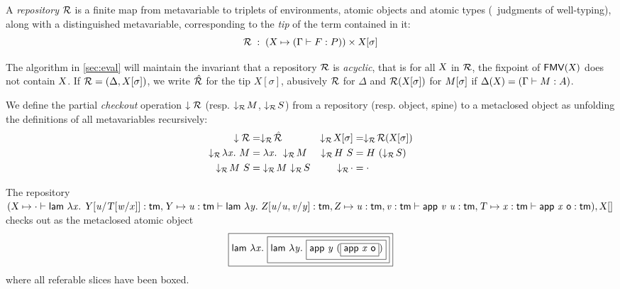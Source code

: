 \documentclass{llncs}
\begin{document}


\begin{definition}
  A \emph{repository} $\mathcal{R}$ is a finite map from metavariable to
  triplets of environments, atomic objects and atomic types (\ie\
  judgments of well-typing), along with a distinguished metavariable,
  corresponding to the \emph{tip} of the term contained in it:
$$ \mathcal{R}\;:\;(\text{\textsl{X}} \mapsto (\Gamma\vdash{F}:{P}))\times{\ensuremath{\text{\textsl{X}}}}[{\sigma}] $$
\end{definition}

The algorithm in \ref{sec:eval} will maintain the invariant that a repository $\mathcal{R}$ is
\emph{acyclic}, that is for all $\text{\textsl{X}}$ in $\mathcal{R}$, the fixpoint of
${\text{\textsf{FMV}}}({\text{\textsl{X}}})$ does not contain $\text{\textsl{X}}$. If $\mathcal{R} = (\Delta,
X[\sigma])$, we write $\hat {\mathcal{R}}$ for the tip $X[\sigma]$, abusively
$\mathcal{R}$ for $\Delta$ and $\mathcal{R} ({\text{\textsl{X}}}[{\sigma}])$ for ${M}[{\sigma}]$
if $\Delta(\text{\textsl{X}}) = (\Gamma\vdash M : A)$.

\begin{definition}
  We define the partial \emph{checkout} operation $\downarrow{\mathcal{R}}$
  (resp. $\downarrow_{\mathcal{R}}\!{M}$, $\downarrow_{\mathcal{R}}\!{S}$) from a repository
  (resp. object, spine) to a metaclosed object as unfolding the
  definitions of all metavariables recursively:
  \begin{align*}
    \checkout{\mr} &= \checkoutr{\hat{\mr}} &
    \checkoutr{\smeta X \sigma} &= \checkoutr{\mr(\smeta X\sigma)}\\
    \checkoutr{\lam x M} &= \lam x \checkoutr{M} &
    \checkoutr{\app H S} &= \app H {(\checkoutr{S})} \\
    \checkoutr{\spinecons M S} &= \spinecons {\checkoutr M} {\checkoutr S} &
    \checkoutr{\spinenil} &= \spinenil
  \end{align*}
\end{definition}

\begin{example}
  The repository
$
(
\text{\textsl{X}} \mapsto
\cdot\vdash
{\ensuremath{\text{\textsf{lam}}}}\  \lambda{\ensuremath{\text{\textit{x}}}}.\  {\text{\textsl{Y}}}[{{\text{\textit{u}}}/{{\text{\textsl{T}}}[{{\text{\textit{w}}}/{x}}]}}] :
\text{\textsf{tm}},
\text{\textsl{Y}} \mapsto
{\ensuremath{\text{\textit{u}}}}:{\text{\textsf{tm}}} \vdash
{\ensuremath{\text{\textsf{lam}}}}\  \lambda{\ensuremath{\text{\textit{y}}}}.\  {\text{\textsl{Z}}}[{{{\text{\textit{u}}}/{\text{\textit{u}}}},{{\text{\textit{v}}}/{\text{\textit{y}}}} }] :
\text{\textsf{tm}}
,
\text{\textsl{Z}} \mapsto
{{\ensuremath{\text{\textit{u}}}}:{\ensuremath{\text{\textsf{tm}}}}},{{\text{\textit{v}}}:{\text{\textsf{tm}}}} \vdash
{{\ensuremath{\text{\textsf{app}}}}\ {\ensuremath{\text{\textit{v}}}}}\ {\text{\textit{u}}} :
\text{\textsf{tm}}
,
\text{\textsl{T}} \mapsto
{\ensuremath{\text{\textit{x}}}}:{\text{\textsf{tm}}} \vdash
{\ensuremath{\text{\textsf{app}}}}\ {\text{\textit{x}}}\ {\text{\textsf{o}}} :
\text{\textsf{tm}}
), {\text{\textsl{X}}}[{}]
$
checks out as the metaclosed atomic object
$$
\fbox{$
  {\text{\textsf{lam}}}\  \lambda{\ensuremath{\text{\textit{x}}}}.\ 
  \fbox{$
    {\text{\textsf{lam}}}\  \lambda{\ensuremath{\text{\textit{y}}}}.\ 
    \fbox{$
      {\text{\textsf{app}}}\  {\text{\textit{y}}}\ 
      (\fbox{$
        {\text{\textsf{app}}}\ {\text{\textit{x}}}\ {\text{\textsf{o}}}
      $})
    $}
  $}
$}
$$
where all referable slices have been boxed.
\end{example}
\end{document}
